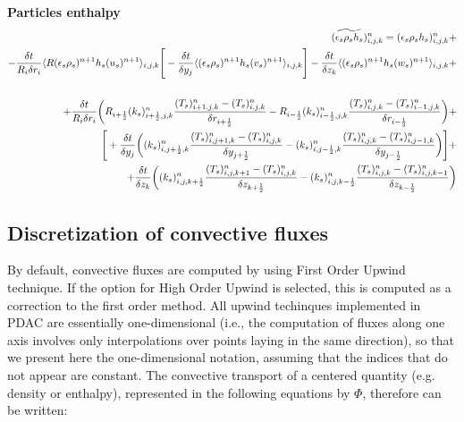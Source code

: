 {\bf Particles enthalpy}\\
%
\begin{eqnarray}
\htmlimage{}
(\widetilde{\epsilon_s \rho_s h_s})^n_{i,j,k} = 
(\epsilon_s \rho_s h_s)_{i,j,k}^{n} +
\nonumber \\
- \frac {\delta t}{R_i \delta r_{i}} 
\langle R (\epsilon_s \rho_s)^{n+1} h_s (u_s)^{n+1} \rangle_{i,j,k}
\Bigg[
- \frac {\delta t}{\delta y_j} 
\langle (\epsilon_s \rho_s)^{n+1} h_s (v_s)^{n+1} \rangle_{i,j,k} 
\Bigg]
- \frac {\delta t}{\delta z_k} 
\langle (\epsilon_s \rho_s)^{n+1} h_s (w_s)^{n+1} \rangle_{i,j,k} + \nonumber \\
\nonumber \\
+ \frac {\delta t} {R_i \delta r_i} \bigg( R_{i+\frac{1}{2}} 
(k_s)_{i+\frac{1}{2},j,k}^{n} 
\frac{(T_s)_{i+1,j,k}^{n} - (T_s)_{i,j,k}^{n}}{\delta r_{i+\frac{1}{2}}} 
- R_{i-\frac{1}{2}} (k_s)_{i-\frac{1}{2},j,k}^{n} 
\frac{(T_s)_{i,j,k}^{n} - (T_s)_{i-1,j,k}^{n}}{\delta r_{i-\frac{1}{2}}} \bigg)
+ \nonumber \\
\Bigg[
+ \frac {\delta t} {\delta y_j} \bigg( (k_s)_{i,j+\frac{1}{2},k}^{n} 
\frac{(T_s)_{i,j+1,k}^{n} - (T_s)_{i,j,k}^{n}}{\delta y_{j+\frac{1}{2}}} - 
(k_s)_{i,j-\frac{1}{2},k}^{n} \frac{(T_s)_{i,j,k}^{n} - 
(T_s)_{i,j-1,k}^{n}}{\delta y_{j-\frac{1}{2}}} \bigg)
\Bigg] +
\nonumber \\
+ \frac {\delta t} {\delta z_k} \bigg( (k_s)_{i,j,k+\frac{1}{2}}^{n} 
\frac{(T_s)_{i,j,k+1}^{n} - (T_s)_{i,j,k}^{n}}{\delta z_{k+\frac{1}{2}}} - 
(k_s)_{i,j,k-\frac{1}{2}}^{n} \frac{(T_s)_{i,j,k}^{n} - 
(T_s)_{i,j,k-1}^{n}}{\delta z_{k-\frac{1}{2}}} \bigg)
\nonumber
\end{eqnarray}
\newpage
%
\subsection{Discretization of convective fluxes}
By default, convective fluxes are computed by using First Order Upwind 
technique.
If the option for High Order Upwind is selected, this is computed as
a correction to the first order method. All upwind techinques implemented
in PDAC are essentially one-dimensional (i.e., the computation of fluxes
along one axis involves only interpolations over points laying in the 
same direction), so that we present here the one-dimensional notation,
assuming that the indices that do not appear are constant.
The convective transport of a centered quantity (e.g. density or enthalpy),
represented in the following equations by $\Phi$, therefore can be written:


